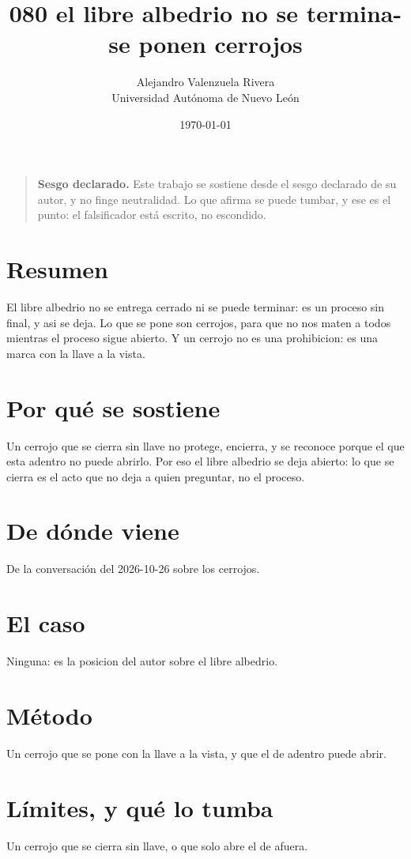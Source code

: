 \documentclass[11pt,a4paper]{article}
\title{080 el libre albedrio no se termina- se ponen cerrojos}
\author{Alejandro Valenzuela Rivera\\\small Universidad Autónoma de Nuevo León}
\date{\today}
\begin{document}
\maketitle

\begin{quote}
\textbf{Sesgo declarado.} Este trabajo se sostiene desde el sesgo declarado de su autor, y no finge neutralidad. Lo que afirma se puede tumbar, y ese es el punto: el falsificador está escrito, no escondido.
\end{quote}

\section*{Resumen}
El libre albedrio no se entrega cerrado ni se puede terminar: es un proceso sin final, y asi se deja. Lo que se pone son cerrojos, para que no nos maten a todos mientras el proceso sigue abierto. Y un cerrojo no es una prohibicion: es una marca con la llave a la vista.

\section{Por qué se sostiene}
Un cerrojo que se cierra sin llave no protege, encierra, y se reconoce porque el que esta adentro no puede abrirlo. Por eso el libre albedrio se deja abierto: lo que se cierra es el acto que no deja a quien preguntar, no el proceso.

\section{De dónde viene}
De la conversación del 2026-10-26 sobre los cerrojos.

\section{El caso}
Ninguna: es la posicion del autor sobre el libre albedrio.

\section{Método}
Un cerrojo que se pone con la llave a la vista, y que el de adentro puede abrir.

\section{Límites, y qué lo tumba}
Un cerrojo que se cierra sin llave, o que solo abre el de afuera.
\end{document}
